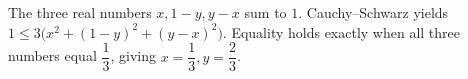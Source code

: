 The three real numbers $x,1-y,y-x$ sum to $1$. Cauchy--Schwarz yields $1\le3\bigl(x^2+(1-y)^2+(y-x)^2\bigr)$. Equality holds exactly when all three numbers equal $\dfrac{1}{3}$, giving $\boxed{x=\dfrac{1}{3},y=\dfrac{2}{3}}$.

